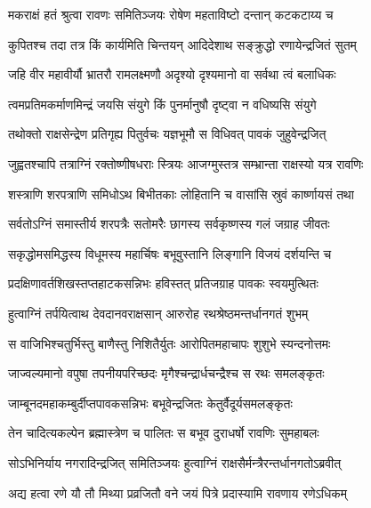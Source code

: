 
\twolineshloka
{मकराक्षं हतं श्रुत्वा रावणः समितिञ्जयः}
{रोषेण महताविष्टो दन्तान् कटकटाय्य च} %

\twolineshloka
{कुपितश्च तदा तत्र किं कार्यमिति चिन्तयन्}
{आदिदेशाथ सङ्क्रुद्धो रणायेन्द्रजितं सुतम्} %

\twolineshloka
{जहि वीर महावीर्यौ भ्रातरौ रामलक्ष्मणौ}
{अदृश्यो दृश्यमानो वा सर्वथा त्वं बलाधिकः} %

\twolineshloka
{त्वमप्रतिमकर्माणमिन्द्रं जयसि संयुगे}
{किं पुनर्मानुषौ दृष्ट्वा न वधिष्यसि संयुगे} %

\twolineshloka
{तथोक्तो राक्षसेन्द्रेण प्रतिगृह्य पितुर्वचः}
{यज्ञभूमौ स विधिवत् पावकं जुहुवेन्द्रजित्} %

\twolineshloka
{जुह्वतश्चापि तत्राग्निं रक्तोष्णीषधराः स्त्रियः}
{आजग्मुस्तत्र सम्भ्रान्ता राक्षस्यो यत्र रावणिः} %

\twolineshloka
{शस्त्राणि शरपत्राणि समिधोऽथ बिभीतकाः}
{लोहितानि च वासांसि स्रुवं कार्ष्णायसं तथा} %

\twolineshloka
{सर्वतोऽग्निं समास्तीर्य शरपत्रैः सतोमरैः}
{छागस्य सर्वकृष्णस्य गलं जग्राह जीवतः} %

\twolineshloka
{सकृद्धोमसमिद्धस्य विधूमस्य महार्चिषः}
{बभूवुस्तानि लिङ्गानि विजयं दर्शयन्ति च} %

\twolineshloka
{प्रदक्षिणावर्तशिखस्तप्तहाटकसन्निभः}
{हविस्तत् प्रतिजग्राह पावकः स्वयमुत्थितः} %

\twolineshloka
{हुत्वाग्निं तर्पयित्वाथ देवदानवराक्षसान्}
{आरुरोह रथश्रेष्ठमन्तर्धानगतं शुभम्} %

\twolineshloka
{स वाजिभिश्चतुर्भिस्तु बाणैस्तु निशितैर्युतः}
{आरोपितमहाचापः शुशुभे स्यन्दनोत्तमः} %

\twolineshloka
{जाज्वल्यमानो वपुषा तपनीयपरिच्छदः}
{मृगैश्चन्द्रार्धचन्द्रैश्च स रथः समलङ्कृतः} %

\twolineshloka
{जाम्बूनदमहाकम्बुर्दीप्तपावकसन्निभः}
{बभूवेन्द्रजितः केतुर्वैदूर्यसमलङ्कृतः} %

\twolineshloka
{तेन चादित्यकल्पेन ब्रह्मास्त्रेण च पालितः}
{स बभूव दुराधर्षो रावणिः सुमहाबलः} %

\twolineshloka
{सोऽभिनिर्याय नगरादिन्द्रजित् समितिञ्जयः}
{हुत्वाग्निं राक्षसैर्मन्त्रैरन्तर्धानगतोऽब्रवीत्} %

\twolineshloka
{अद्य हत्वा रणे यौ तौ मिथ्या प्रव्रजितौ वने}
{जयं पित्रे प्रदास्यामि रावणाय रणेऽधिकम्} %

